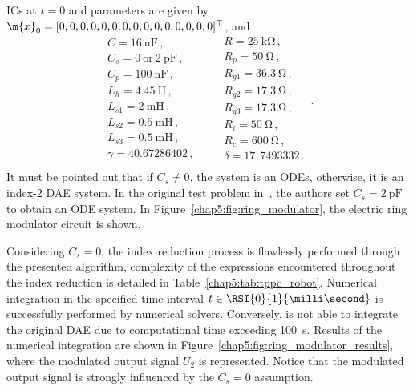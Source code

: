 %
\acp{IC} at $t = 0$ and parameters are given by $\m{x}_0 = [0, 0, 0, 0, 0, 0, 0, 0, 0, 0, 0, 0, 0, 0, 0]^\top$, and
%
\begin{equation*}
  \begin{array}{l}
    C = \SI{16}{\nano\farad} \, \text{,} \\
    C_s = 0~\text{or}~\SI{2}{\pico\farad} \, \text{,} \\
    C_p = \SI{100}{\nano\farad} \, \text{,} \\
    L_h = \SI{4.45}{\henry} \, \text{,} \\
    L_{s1} = \SI{2}{\milli\henry} \, \text{,} \\
    L_{s2} = \SI{0.5}{\milli\henry} \, \text{,} \\
    L_{s3} = \SI{0.5}{\milli\henry} \, \text{,} \\
    \gamma = 40.67286402 \, \text{,} \\
  \end{array}
  \qquad
  \begin{array}{l}
    R = \SI{25}{\kilo\ohm} \, \text{,} \\
    R_p = \SI{50}{\ohm} \, \text{,} \\
    R_{g1} = \SI{36.3}{\ohm} \, \text{,} \\
    R_{g2} = \SI{17.3}{\ohm} \, \text{,} \\
    R_{g3} = \SI{17.3}{\ohm} \, \text{,} \\
    R_{i} = \SI{50}{\ohm} \, \text{,} \\
    R_{c} = \SI{600}{\ohm} \, \text{,} \\
    \delta = 17,7493332 \, \text{.} \\
  \end{array} \, \text{.}
\end{equation*}
%
It must be pointed out that if $C_s \neq 0$, the system is an \acp{ODE}, otherwise, it is an index-2 \ac{DAE} system. In the original test problem in~\cite{lioen1998test, mazzia2008test}, the authors set $C_s = \SI{2}{\pico\farad}$ to obtain an \ac{ODE} system. In Figure~\ref{chap5:fig:ring_modulator}, the electric ring modulator circuit is shown.

Considering $C_s = 0$, the index reduction process is flawlessly performed through the presented algorithm, complexity of the expressions encountered throughout the index reduction is detailed in Table~\ref{chap5:tab:tppc_robot}. Numerical integration in the specified time interval $t \in \RSI{0}{1}{\milli\second}$ is successfully performed by \Indigo{} numerical solvers. Conversely, \Maple{} is not able to integrate the original \ac{DAE} due to computational time exceeding \SI{100}{\second}. Results of the numerical integration are shown in Figure~\ref{chap5:fig:ring_modulator_results}, where the modulated output signal $U_2$ is represented. Notice that the modulated output signal is strongly influenced by the $C_s = 0$ assumption.

